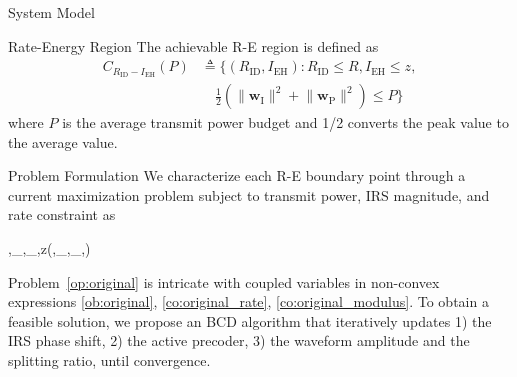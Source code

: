 \documentclass[journal]{IEEEtran}
\newtheorem{remark}{Remark}
\begin{document}
\begin{section}{System Model}
		\begin{subsection}{Rate-Energy Region}
			The achievable R-E region is defined as
			\begin{align}
				C_{R_{\mathrm{ID}}-I_{\mathrm{EH}}}(P)
				&\triangleq \biggl\{(R_{\mathrm{ID}}, I_{\mathrm{EH}}): R_{\mathrm{ID}} \le R, I_{\mathrm{EH}} \le z,\nonumber\\
				&\quad \frac{1}{2}\left(\lVert{\boldsymbol{w}_{\mathrm{I}}}\rVert^2+\lVert{\boldsymbol{w}_{\mathrm{P}}}\rVert^2\right) \le P\biggr\}
			\end{align}
			where $P$ is the average transmit power budget and \num{1/2} converts the peak value to the average value.
		\end{subsection}
	\end{section}


	\begin{section}{Problem Formulation}\label{se:problem_formulation}
		We characterize each R-E boundary point through a current maximization problem subject to transmit power, IRS magnitude, and rate constraint as
		\begin{maxi!}
			{\boldsymbol{\phi},_{},_{},\rho}{z(\boldsymbol{\phi},_{},_{},\rho)}{\label{op:original}}{\label{ob:original}}
			\label{co:original_power}
			\label{co:original_rate}
			\label{co:original_modulus}
		\end{maxi!}

		Problem~\eqref{op:original} is intricate with coupled variables in non-convex expressions \eqref{ob:original}, \eqref{co:original_rate}, \eqref{co:original_modulus}. To obtain a feasible solution, we propose an BCD algorithm that iteratively updates 1) the IRS phase shift, 2) the active precoder, 3) the waveform amplitude and the splitting ratio, until convergence.



\end{section}
\end{document}
